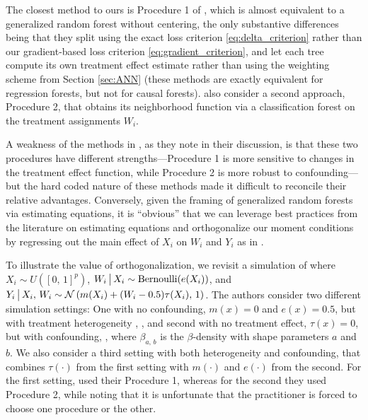 \documentclass[aos]{imsart}
\theoremstyle{plain}
\theoremstyle{definition}
\theoremstyle{remark}
\begin{document}
\begin{CJK}{UTF8}{gbsn}
The closest method to ours is Procedure 1
of \citet{wager2015estimation}, which is almost equivalent to a generalized random forest without centering,
the only substantive differences being that they split using the exact loss
criterion \eqref{eq:delta_criterion} rather than our gradient-based loss criterion \eqref{eq:gradient_criterion},
and let each tree compute its own treatment effect estimate rather than using the weighting scheme
from Section \ref{sec:ANN} (these methods are exactly equivalent for regression forests, but not
for causal forests).
\citet{wager2015estimation} also consider a second approach, Procedure 2, that obtains its
neighborhood function via a classification forest on the treatment assignments $W_i$.

A weakness of the methods in \citet{wager2015estimation}, as they note in their discussion, is
that these two procedures have different strengths---Procedure 1 is more sensitive to changes
in the treatment effect function, while Procedure 2 is more robust to confounding---but the
hard coded nature of these methods made it difficult to reconcile their relative advantages.
Conversely, given the framing of generalized random forests via
estimating equations, it is ``obvious'' that we can leverage best practices from the literature
on estimating equations and orthogonalize our moment conditions by regressing
out the main effect of $X_i$ on $W_i$ and $Y_i$ as in \citet{robinson1988root}.

To illustrate the value of orthogonalization, we revisit a simulation of
\citet{wager2015estimation} where $X_i \sim U([0, \, 1]^p)$,
$W_i \,\big|\, X_i \sim \text{Bernoulli}(e(X_i))$, and
$Y_i \,\big|\, X_i, \, W_i \sim \mathcal{N}\left(m(X_i) + (W_i - 0.5) \tau(X_i), \, 1\right)$. The authors
consider two different simulation settings: One with no confounding,
$m(x) = 0$ and $e(x) = 0.5$, but with treatment heterogeneity
, ,
and second with no treatment effect, $\tau(x) = 0$, but with confounding,
,
where $\beta_{a, \, b}$ is the $\beta$-density with shape parameters $a$ and $b$. We also consider a third setting with both heterogeneity and confounding, that combines $\tau(\cdot)$ from the first setting with $m(\cdot)$ and $e(\cdot)$ from the second. For the first setting, \citet{wager2015estimation} used their Procedure 1, whereas for the second they used Procedure 2, while noting that it is unfortunate that the practitioner is forced to choose one procedure or the other.


\end{CJK}
\end{document}
